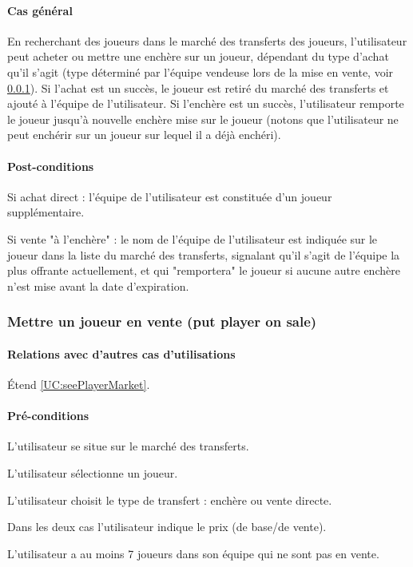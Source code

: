 \paragraph{Cas général}
En recherchant des joueurs dans le marché des transferts des joueurs, l'utilisateur peut acheter ou mettre une enchère sur un joueur, dépendant du type d'achat qu'il s'agit (type déterminé par l'équipe vendeuse lors de la mise en vente, voir \ref{UC:putPlayerOnSale}). Si l'achat est un succès, le joueur est retiré du marché des transferts et ajouté à l'équipe de l'utilisateur. Si l'enchère est un succès, l'utilisateur remporte le joueur jusqu'à nouvelle enchère mise sur le joueur (notons que l'utilisateur ne peut enchérir sur un joueur sur lequel il a déjà enchéri). 
\paragraph{Post-conditions}
\begin{list}{}{\leftmargin=1.5em}
\item{Si achat direct : l'équipe de l'utilisateur est constituée d'un joueur supplémentaire.}
\item{Si vente "à l'enchère" : le nom de l'équipe de l'utilisateur est indiquée sur le joueur dans la liste du marché des transferts, signalant qu'il s'agit de l'équipe la plus offrante actuellement, et qui "remportera" le joueur si aucune autre enchère n'est mise avant la date d'expiration.}
\end{list}

\subsubsection{Mettre un joueur en vente (put player on sale)}
\label{UC:putPlayerOnSale}
\paragraph{Relations avec d'autres cas d'utilisations}
Étend \ref{UC:seePlayerMarket}.
\paragraph{Pré-conditions}
\begin{list}{}{\leftmargin=1.5em}
\item{L'utilisateur se situe sur le marché des transferts.}
\item{L'utilisateur sélectionne un joueur.}
\item{L'utilisateur choisit le type de transfert : enchère ou vente directe.}
\item{Dans les deux cas l'utilisateur indique le prix (de base/de vente).}
\item{L'utilisateur a au moins 7 joueurs dans son équipe qui ne sont pas en vente.}
\end{list}
